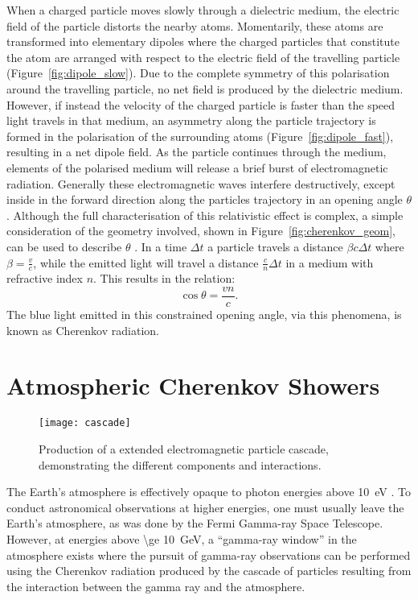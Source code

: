 When a charged particle moves slowly through a dielectric medium, the electric field of the particle distorts the nearby atoms. Momentarily, these atoms are transformed into elementary dipoles where the charged particles that constitute the atom are arranged with respect to the electric field of the travelling particle (Figure~\ref{fig:dipole_slow}). Due to the complete symmetry of this polarisation around the travelling particle, no net field is produced by the dielectric medium. However, if instead the velocity of the charged particle is faster than the speed light travels in that medium, an asymmetry along the particle trajectory is formed in the polarisation of the surrounding atoms (Figure~\ref{fig:dipole_fast}), resulting in a net dipole field. As the particle continues through the medium, elements of the polarised medium will release a brief burst of electromagnetic radiation. Generally these electromagnetic waves interfere destructively, except inside in the forward direction along the particles trajectory in an opening angle $\theta$. Although the full characterisation of this relativistic effect is complex, a simple consideration of the geometry involved, shown in Figure~\ref{fig:cherenkov_geom}, can be used to describe $\theta$ \cite{Jelley1958a}. In a time $\Delta t$ a particle travels a distance $\beta c \Delta t$ where $\beta = \frac{v}{c}$, while the emitted light will travel a distance $\frac{c}{n} \Delta t$ in a medium with refractive index $n$. This results in the relation:
\begin{equation} \label{eq:cherenkov_angle}
\cos \theta = \frac{vn}{c}.
\end{equation}
The blue light emitted in this constrained opening angle, via this phenomena, is known as Cherenkov radiation.

\section{Atmospheric Cherenkov Showers} \label{section:cherenkov_shower_intro}

\begin{figure}
	\centering\texttt{[image: cascade]} 
	\caption[Production of a extended electromagnetic particle cascade.]{Production of a extended electromagnetic particle cascade, demonstrating the different components and interactions.}
	\label{fig:cascade}
\end{figure}

The Earth's atmosphere is effectively opaque to photon energies above \SI{10}{eV} \cite{Weekes2003}. To conduct astronomical observations at higher energies, one must usually leave the Earth's atmosphere, as was done by the Fermi Gamma-ray Space Telescope. However, at energies above \SI{\ge 10}{GeV}, a ``gamma-ray window'' in the atmosphere exists where the pursuit of gamma-ray observations can be performed using the Cherenkov radiation produced by the cascade of particles resulting from the interaction between the gamma ray and the atmosphere.

